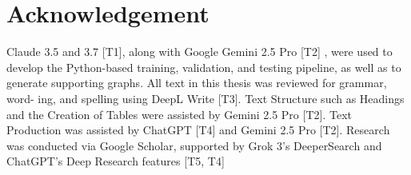 \section*{Acknowledgement}

Claude 3.5 and 3.7 [T1], along with Google Gemini 2.5 Pro [T2] , were used to
develop the Python-based training, validation, and testing pipeline, as well as to
generate supporting graphs. All text in this thesis was reviewed for grammar, word-
ing, and spelling using DeepL Write [T3]. Text Structure such as Headings and
the Creation of Tables were assisted by Gemini 2.5 Pro [T2]. Text Production was
assisted by ChatGPT [T4] and Gemini 2.5 Pro [T2]. Research was conducted via
Google Scholar, supported by Grok 3’s DeeperSearch and ChatGPT’s Deep Research
features [T5, T4]